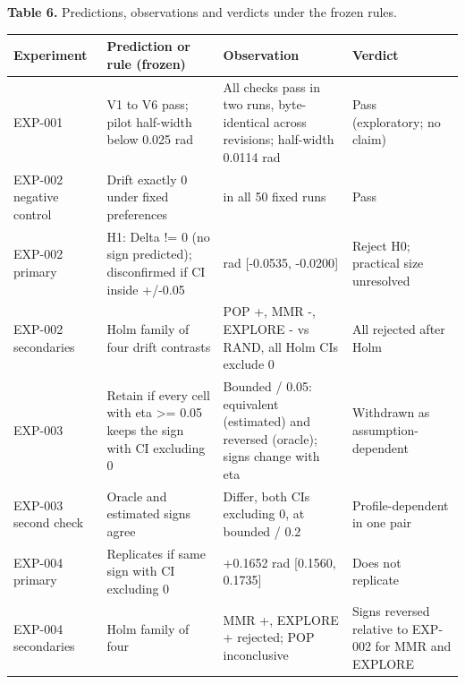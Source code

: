 \documentclass[
]{article}
\begin{document}
\textbf{Table 6.} Predictions, observations and verdicts under the
frozen rules.

\begin{longtable}[]{@{}
  >{\raggedright\arraybackslash}p{}
  >{\raggedright\arraybackslash}p{}
  >{\raggedright\arraybackslash}p{}
  >{\raggedright\arraybackslash}p{}@{}}
\toprule\noalign{}
\begin{minipage}[b]{\linewidth}\raggedright
Experiment
\end{minipage} & \begin{minipage}[b]{\linewidth}\raggedright
Prediction or rule (frozen)
\end{minipage} & \begin{minipage}[b]{\linewidth}\raggedright
Observation
\end{minipage} & \begin{minipage}[b]{\linewidth}\raggedright
Verdict
\end{minipage} \\
\midrule\noalign{}
\endhead
\bottomrule\noalign{}
\endlastfoot
EXP-001 & V1 to V6 pass; pilot half-width below 0.025 rad & All checks
pass in two runs, byte-identical across revisions; half-width 0.0114 rad
& Pass (exploratory; no claim) \\
EXP-002 negative control & Drift exactly 0 under fixed preferences & 0
in all 50 fixed runs & Pass \\
EXP-002 primary & H1: Delta != 0 (no sign predicted); disconfirmed if CI
inside +/-0.05 & -0.0355 rad {[}-0.0535, -0.0200{]} & Reject H0;
practical size unresolved \\
EXP-002 secondaries & Holm family of four drift contrasts & POP +, MMR
-, EXPLORE - vs RAND, all Holm CIs exclude 0 & All rejected after
Holm \\
EXP-003 & Retain if every cell with eta \textgreater= 0.05 keeps the
sign with CI excluding 0 & Bounded / 0.05: equivalent (estimated) and
reversed (oracle); signs change with eta & Withdrawn as
assumption-dependent \\
EXP-003 second check & Oracle and estimated signs agree & Differ, both
CIs excluding 0, at bounded / 0.2 & Profile-dependent in one pair \\
EXP-004 primary & Replicates if same sign with CI excluding 0 & +0.1652
rad {[}0.1560, 0.1735{]} & Does not replicate \\
EXP-004 secondaries & Holm family of four & MMR +, EXPLORE + rejected;
POP inconclusive & Signs reversed relative to EXP-002 for MMR and
EXPLORE \\
\end{longtable}
\end{document}
